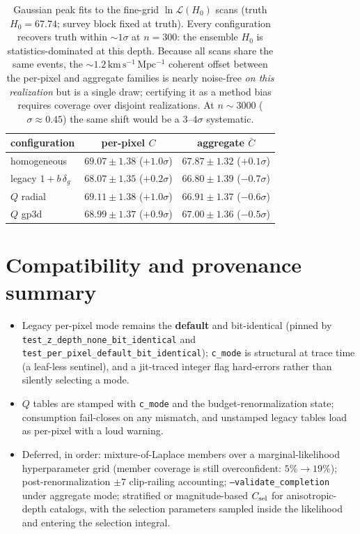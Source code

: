 \documentclass[11pt]{article}
\newcommand{\Cbar}{\bar{C}}
\begin{document}
\begin{table}[h!]
\centering
\small
\begin{tabular}{lcc}
\toprule
configuration & per-pixel $C$ & aggregate $\Cbar$ \\
\midrule
homogeneous      & $69.07 \pm 1.38$ \;($+1.0\sigma$) & $67.87 \pm 1.32$ \;($+0.1\sigma$) \\
legacy $1+b\,\delta_g$ & $68.07 \pm 1.35$ \;($+0.2\sigma$) & $66.80 \pm 1.39$ \;($-0.7\sigma$) \\
$Q$ radial       & $69.11 \pm 1.38$ \;($+1.0\sigma$) & $66.91 \pm 1.37$ \;($-0.6\sigma$) \\
$Q$ gp3d         & $68.99 \pm 1.37$ \;($+0.9\sigma$) & $67.00 \pm 1.36$ \;($-0.5\sigma$) \\
\bottomrule
\end{tabular}
\caption{Gaussian peak fits to the fine-grid $\ln\mathcal{L}(H_0)$ scans
(truth $H_0 = 67.74$; survey block fixed at truth). Every configuration recovers
truth within $\sim 1\sigma$ at $n = 300$: the ensemble $H_0$ is
statistics-dominated at this depth. Because all scans share the same events, the
$\sim 1.2\,\mathrm{km\,s^{-1}\,Mpc^{-1}}$ coherent offset between the per-pixel and
aggregate families is nearly noise-free \emph{on this realization} but is a single
draw; certifying it as a method bias requires coverage over disjoint realizations.
At $n \sim 3000$ ($\sigma \approx 0.45$) the same shift would be a $3$--$4\sigma$
systematic.}
\end{table}

\section{Compatibility and provenance summary}

\begin{itemize}
\item Legacy per-pixel mode remains the \textbf{default} and bit-identical
(pinned by \texttt{test\_z\_depth\_none\_bit\_identical} and
\texttt{test\_per\_pixel\_default\_bit\_identical}); \texttt{c\_mode} is structural
at trace time (a leaf-less sentinel), and a jit-traced integer flag hard-errors
rather than silently selecting a mode.
\item $Q$ tables are stamped with \texttt{c\_mode} and the budget-renormalization
state; consumption fail-closes on any mismatch, and unstamped legacy tables load as
per-pixel with a loud warning.
\item Deferred, in order: mixture-of-Laplace members over a marginal-likelihood
hyperparameter grid (member coverage is still overconfident: $5\% \to 19\%$);
post-renormalization $\pm 7$ clip-railing accounting;
\texttt{--validate\_completion} under aggregate mode; stratified or magnitude-based
$C_{\rm sel}$ for anisotropic-depth catalogs, with the selection parameters sampled
inside the likelihood and entering the selection integral.
\end{itemize}
\end{document}
